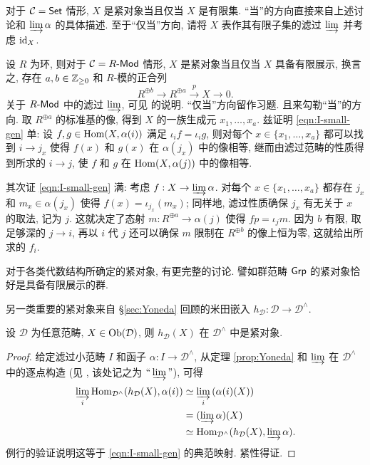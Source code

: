 \begin{example}\label{eg:Set-cpt}
	对于 $\mathcal{C} = \mathsf{Set}$ 情形, $X$ 是紧对象当且仅当 $X$ 是有限集. ``当''的方向直接来自上述讨论和 $\varinjlim \alpha$ 的具体描述. 至于``仅当''方向, 请将 $X$ 表作其有限子集的滤过 $\varinjlim$ 并考虑 $\mathrm{id}_X$.
\end{example}

\begin{example}\label{eg:Mod-cpt}
	设 $R$ 为环, 则对于 $\mathcal{C} = R\text{-}\mathsf{Mod}$ 情形, $X$ 是紧对象当且仅当 $X$ 具备有限展示, 换言之, 存在 $a, b \in \mathbb{Z}_{\geq 0}$ 和 $R$-模的正合列
	\[ R^{\oplus b} \to R^{\oplus a} \xrightarrow{p} X \to 0 .\]
	关于 $R\text{-}\mathsf{Mod}$ 中的滤过 $\varinjlim$, 可见 \cite[注记 6.2.3]{Li1} 的说明. ``仅当''方向留作习题. 且来勾勒``当''的方向. 取 $R^{\oplus a}$ 的标准基的像, 得到 $X$ 的一族生成元 $x_1, \ldots, x_a$. 兹证明 \eqref{eqn:I-small-gen} 单: 设 $f, g \in \operatorname{Hom}(X, \alpha(i))$ 满足 $\iota_i f = \iota_i g$, 则对每个 $x \in \{x_1, \ldots, x_a \}$ 都可以找到 $i \to j_x$ 使得 $f(x)$ 和 $g(x)$ 在 $\alpha(j_x)$ 中的像相等, 继而由滤过范畴的性质得到所求的 $i \to j$, 使 $f$ 和 $g$ 在 $\operatorname{Hom}(X, \alpha(j))$ 中的像相等.

	其次证 \eqref{eqn:I-small-gen} 满: 考虑 $f: X \to \varinjlim \alpha$. 对每个 $x \in \{x_1, \ldots, x_a \}$ 都存在 $j_x$ 和 $m_x \in \alpha(j_x)$ 使得 $f(x) = \iota_{j_x}(m_x)$; 同样地, 滤过性质确保 $j_x$ 有无关于 $x$ 的取法, 记为 $j$. 这就决定了态射 $m: R^{\oplus a} \to \alpha(j)$ 使得 $fp = \iota_j m$. 因为 $b$ 有限, 取足够深的 $j \to i$, 再以 $i$ 代 $j$ 还可以确保 $m$ 限制在 $R^{\oplus b}$ 的像上恒为零, 这就给出所求的 $f_i$.
\end{example}

对于各类代数结构所确定的紧对象, \cite[1.2 Examples, 3.12 Theorem]{AR94} 有更完整的讨论. 譬如群范畴 $\mathsf{Grp}$ 的紧对象恰好是具备有限展示的群.

另一类重要的紧对象来自 \S\ref{sec:Yoneda} 回顾的米田嵌入 $h_{\mathcal{D}}: \mathcal{D} \to \mathcal{D}^\wedge$.

\begin{proposition}\label{prop:Ind-cpt}
	设 $\mathcal{D}$ 为任意范畴, $X \in \operatorname{Ob}(\mathcal{D})$, 则 $h_{\mathcal{D}}(X)$ 在 $\mathcal{D}^\wedge$ 中是紧对象.
\end{proposition}
\begin{proof}
	给定滤过小范畴 $I$ 和函子 $\alpha: I \to \mathcal{D}^\wedge$, 从定理 \ref{prop:Yoneda} 和 $\varinjlim$ 在 $\mathcal{D}^\wedge$ 中的逐点构造 (见 \cite[命题 2.7.8]{Li1}, 该处记之为 $\Yinjlim$), 可得
	\begin{align*}
		\varinjlim_i \operatorname{Hom}_{\mathcal{D}^{\wedge}}(h_{\mathcal{D}}(X), \alpha(i)) & \simeq \varinjlim_i \left(\alpha(i)(X)\right) \\
		& = (\varinjlim \alpha)(X) \\
		& \simeq \operatorname{Hom}_{\mathcal{D}^\wedge}(h_{\mathcal{D}}(X), \varinjlim \alpha).
	\end{align*}
	例行的验证说明这等于 \eqref{eqn:I-small-gen} 的典范映射. 紧性得证.
\end{proof}

